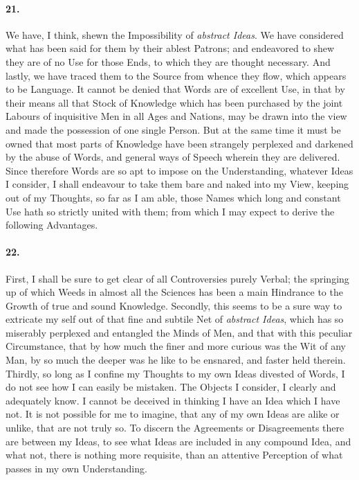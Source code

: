 \documentclass[]{article}
\newenvironment{sectionbody}{}{}
\begin{document}
\begin{sectionbody}
\paragraph{21.} We have, I think, shewn the Impossibility of \emph{abstract
Ideas}.  We have considered what has been said for them by
their ablest Patrons; and endeavored to shew they are of no Use
for those Ends, to which they are thought necessary.  And lastly,
we have traced them to the Source from whence they flow, which
appears to be Language.  It cannot be denied that Words are of
excellent Use, in that by their means all that Stock of Knowledge
which has been purchased by the joint Labours of inquisitive Men
in all Ages and Nations, may be drawn into the view and made the
possession of one single Person.  But at the same time it must be
owned that most parts of Knowledge have been strangely perplexed
and darkened by the abuse of Words, and general ways of Speech
wherein they are delivered.  Since therefore Words are so apt to
impose on the Understanding, whatever Ideas I consider, I shall
endeavour to take them bare and naked into my View, keeping out
of my Thoughts, so far as I am able, those Names which long and
constant Use hath so strictly united with them; from which I may
expect to derive the following Advantages.



\paragraph{22.} First, I shall be sure to get clear of all Controversies purely
Verbal; the springing up of which Weeds in almost all the
Sciences has been a main Hindrance to the Growth of true and
sound Knowledge.  Secondly, this seems to be a sure way to
extricate my self out of that fine and subtile Net of
\emph{abstract Ideas}, which has so miserably perplexed and
entangled the Minds of Men, and that with this peculiar
Circumstance, that by how much the finer and more curious was the
Wit of any Man, by so much the deeper was he like to be
ensnared, and faster held therein. Thirdly, so long as I confine
my Thoughts to my own Ideas divested of Words, I do not see how I
can easily be mistaken.  The Objects I consider, I clearly and
adequately know.  I cannot be deceived in thinking I have an Idea
which I have not.  It is not possible for me to imagine, that any
of my own Ideas are alike or unlike, that are not truly so.  To
discern the Agreements or Disagreements there are between my
Ideas, to see what Ideas are included in any compound Idea, and
what not, there is nothing more requisite, than an attentive
Perception of what passes in my own Understanding.




\end{sectionbody}
\end{document}
